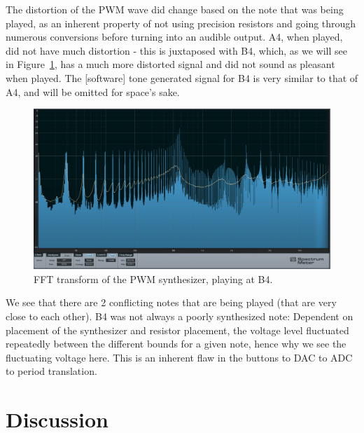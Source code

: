 \documentclass[12pt]{article}
\begin{document}
The distortion of the PWM wave did change based on the note that was being played, as an inherent property of not using precision resistors and going through numerous conversions before turning into an audible output. A4, when played, did not have much distortion - this is juxtaposed with B4, which, as we will see in Figure~\ref{fig:fftb4}, has a much more distorted signal and did not sound as pleasant when played. The [software] tone generated signal for B4 is very similar to that of A4, and will be omitted for space's sake. 

\begin{figure}
    \centering
    \includegraphics[width = \textwidth]{FFTB4.png}
    \caption{FFT transform of the PWM synthesizer, playing at B4. }
    \label{fig:fftb4}
\end{figure}


We see that there are 2 conflicting notes that are being played (that are very close to each other). B4 was not always a poorly synthesized note: Dependent on placement of the synthesizer and resistor placement, the voltage level fluctuated repeatedly between the different bounds for a given note, hence why we see the fluctuating voltage here. This is an inherent flaw in the buttons to DAC to ADC to period translation. 


\section{Discussion}\label{sec:discussion}

\end{document}
